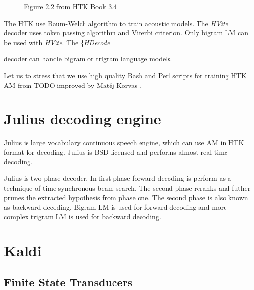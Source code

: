 {\begin{figure}[!htp]
    \begin{center}
    
    \caption{Figure 2.2 from HTK Book 3.4\cite{TODO_HTK_BOOK_Figure 2.2.}}
    \label{fig:htk_tools} 
    \end{center}
\end{figure}

The \ac{HTK} use Baum-Welch algorithm to train acoustic models.
The {\it HVite} decoder uses token passing algorithm and Viterbi criterion.
\cite{HTKBook3.4} %
Only bigram \ac{LM} can be used with {\it HVite}.
The \{\it HDecode} decoder can handle bigram or trigram language models. 


Let us to stress that we use high quality Bash and Perl scripts for training \ac{HTK} \ac{AM}
from TODO improved by Matěj Korvas \cite{TODO}.

\section{Julius decoding engine}
\label{sec:back_julius}

Julius is large vocabulary continuous speech engine, which can use \ac{AM} in \ac{HTK} format for decoding.\cite{JULIUS_TODO}
Julius is BSD licensed \cite{BSD_TODO} and performs almost real-time decoding.

Julius is two phase decoder. In first phase forward decoding is perform as
a technique of time synchronous beam search.
The second phase reranks and futher prunes the extracted hypothesis from phase one.
The second phase is also known as backward decoding.
Bigram \ac{LM} is used for forward decoding and more complex trigram \ac{LM} is used for backward decoding.






\section{Kaldi}
\label{sec:back_kaldi}

\subsection{Finite State Transducers} 
\label{sec:fst}



